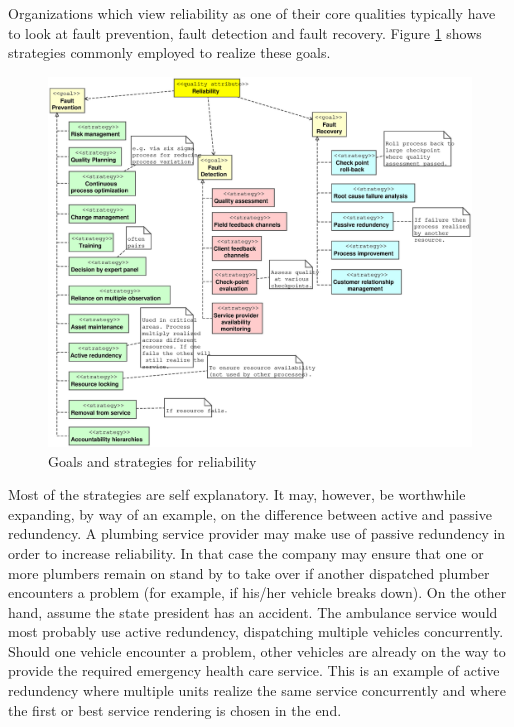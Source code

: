 \documentclass[11pt,english,a4]{article}
\begin{document}
Organizations which view reliability as one of their core qualities typically have to look at fault prevention, fault detection and fault recovery. Figure \ref{reliabilityTactics_fig} shows strategies commonly employed to realize these goals.

\begin{figure}[hbt]
  \begin{center}
    \includegraphics[scale=0.4]{reliabilityTactics}
    \caption{Goals and strategies for reliability}\label{reliabilityTactics_fig}
  \end{center}
\end{figure}


Most of the strategies are self explanatory. It may, however, be worthwhile expanding, by way of an example, on the difference between active and passive redundency. A plumbing service provider may make use of passive redundency in order to increase reliability. In that case the company may ensure that one or more plumbers remain on stand by to take over if another dispatched plumber encounters a problem (for example, if his/her vehicle breaks down). On the other hand, assume the state president has an accident. The ambulance service would most probably use active redundency, dispatching multiple vehicles concurrently. Should one vehicle encounter a problem, other vehicles are already on the way to provide the required emergency health care service. This is an example of active redundency where multiple units realize the same service concurrently and where the first or best service rendering is chosen in the end.
\end{document}
